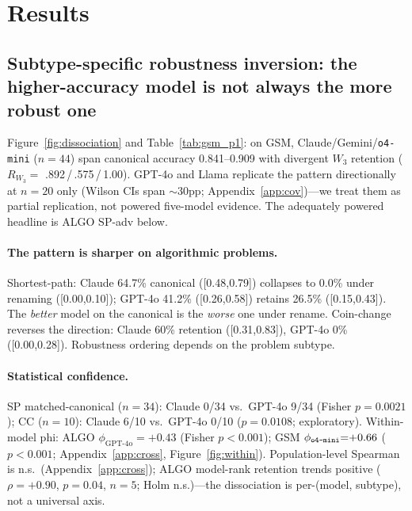 \documentclass{article}
\newcommand{\omini}{\texttt{o4-mini}}     %
\newcommand{\wthree}{\ensuremath{W_3}}
\newcommand{\Rwiii}{\ensuremath{R_{W_3}}}
\begin{document}


\section{Results}
\label{sec:results}

\subsection{Subtype-specific robustness inversion: the higher-accuracy model is not always the more robust one}
\label{sec:inversion}

Figure~\ref{fig:dissociation} and Table~\ref{tab:gsm_p1}: on GSM,
Claude/Gemini/\omini{} ($n{=}44$) span canonical accuracy 0.841--0.909
with divergent \wthree{} retention ($\Rwiii{=}$
.892\,/\,.575\,/\,1.00). GPT-4o and Llama replicate the pattern directionally
at $n{=}20$ only (Wilson CIs span $\sim$30pp; Appendix~\ref{app:cov})---we
treat them as partial replication, not powered five-model evidence. The
adequately powered headline is ALGO SP-adv below.

\paragraph{The pattern is sharper on algorithmic problems.}
Shortest-path: Claude 64.7\% canonical ([0.48,0.79]) collapses to 0.0\% under
renaming ([0.00,0.10]); GPT-4o 41.2\% ([0.26,0.58]) retains 26.5\%
([0.15,0.43]). The \emph{better} model on the canonical is the \emph{worse}
one under rename. Coin-change reverses the direction: Claude 60\% retention
([0.31,0.83]), GPT-4o 0\% ([0.00,0.28]). Robustness ordering depends on the
problem subtype.

\paragraph{Statistical confidence.}
SP matched-canonical ($n{=}34$): Claude 0/34 vs.\ GPT-4o 9/34 (Fisher
$p{=}0.0021$); CC ($n{=}10$): Claude 6/10 vs.\ GPT-4o 0/10 ($p{=}0.0108$;
exploratory). Within-model phi: ALGO $\phi_{\text{GPT-4o}}{=}{+}0.43$ (Fisher
$p{<}0.001$); GSM $\phi_{\text{\omini}}{=}{+}0.66$ ($p{<}0.001$;
Appendix~\ref{app:cross}, Figure~\ref{fig:within}). Population-level Spearman
is n.s.\ (Appendix~\ref{app:cross}); ALGO model-rank retention trends
positive ($\rho{=}{+}0.90$, $p{=}0.04$, $n{=}5$; Holm n.s.)---the
dissociation is per-(model, subtype), not a universal axis.
\end{document}
